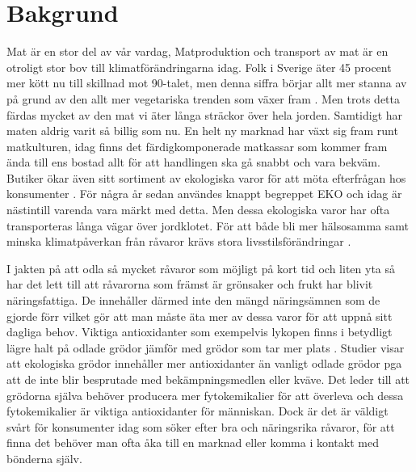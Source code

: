 \documentclass[10pt,a4paper,oneside]{article}
\begin{document}
\section{Bakgrund}
Mat är en stor del av vår vardag, Matproduktion och transport av mat är en otroligt stor bov till klimatförändringarna idag. Folk i Sverige äter 45 procent mer kött nu till skillnad mot 90-talet, men denna siffra börjar allt mer stanna av på grund av den allt mer vegetariska trenden som växer fram \cite{Naturskyddsföreningen1}. Men trots detta färdas mycket av den mat vi äter långa sträckor över hela jorden. Samtidigt har maten aldrig varit så billig som nu. En helt ny marknad har växt sig fram runt matkulturen, idag finns det färdigkomponerade matkassar som kommer fram ända till ens bostad allt för att handlingen ska gå snabbt och vara bekväm. Butiker ökar även sitt sortiment av ekologiska varor för att möta efterfrågan hos konsumenter \cite{ICA2}. För några år sedan användes knappt begreppet EKO och idag är nästintill varenda vara märkt med detta. Men dessa ekologiska varor har ofta transporteras långa vägar över jordklotet. För att både bli mer hälsosamma samt minska klimatpåverkan från råvaror krävs stora livsstilsförändringar \cite{Jordbruksverket}. 
 
I jakten på att odla så mycket råvaror som möjligt på kort tid och liten yta så har det lett till att råvarorna som främst är grönsaker och frukt har blivit näringsfattiga. De innehåller därmed inte den mängd näringsämnen som de gjorde förr vilket gör att man måste äta mer av dessa varor för att uppnå sitt dagliga behov. Viktiga antioxidanter som exempelvis lykopen finns i betydligt lägre halt på odlade grödor jämför med grödor som tar mer plats \cite{SR}. Studier visar att ekologiska grödor innehåller mer antioxidanter än vanligt odlade grödor pga att de inte blir besprutade med bekämpningsmedlen eller kväve. Det leder till att grödorna själva behöver producera mer fytokemikalier för att överleva och dessa fytokemikalier är viktiga antioxidanter för människan. Dock är det är väldigt svårt för konsumenter idag som söker efter bra och näringsrika råvaror, för att finna det behöver man ofta åka till en marknad eller komma i kontakt med bönderna själv.
 
\end{document}
